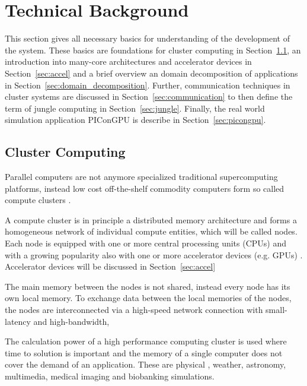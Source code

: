 \section{Technical Background}
\label{sec:technical_background}
This section gives all necessary basics for understanding of the
development of the system.  These basics are foundations for cluster
computing in Section~\ref{sec:cluster}, an introduction into many-core
architectures and accelerator devices in Section~\ref{sec:accel} and a
brief overview an domain decomposition of applications in
Section~\ref{sec:domain_decomposition}. Further, communication
techniques in cluster systems are discussed in
Section~\ref{sec:communication} to then define the term of jungle
computing in Section~\ref{sec:jungle}. Finally, the real world
simulation application PIConGPU is describe in
Section~\ref{sec:picongpu}.

\subsection{Cluster Computing}
\label{sec:cluster}
Parallel computers are not anymore specialized traditional
supercomputing platforms, instead low cost off-the-shelf commodity
computers form so called compute clusters \cite{ref:hpcc1}.

A compute cluster is in principle a distributed memory architecture
and forms a homogeneous network of individual compute entities, which
will be called nodes. Each node is equipped with one or more central
processing units (CPUs) and with a growing popularity also with one or
more accelerator devices (e.g. GPUs) \cite{ref:accel}. Accelerator
devices will be discussed in Section~\ref{sec:accel}

The main memory between the nodes is not shared, instead every node
has its own local memory.  To exchange data between the local memories
of the nodes, the nodes are interconnected via a high-speed network
connection with small-latency and high-bandwidth,

The calculation power of a high performance computing cluster is used
where time to solution is important and the memory of a single
computer does not cover the demand of an application. These are
physical \cite{ref:picongpu}, weather, astronomy, multimedia, medical
imaging and biobanking simulations.


